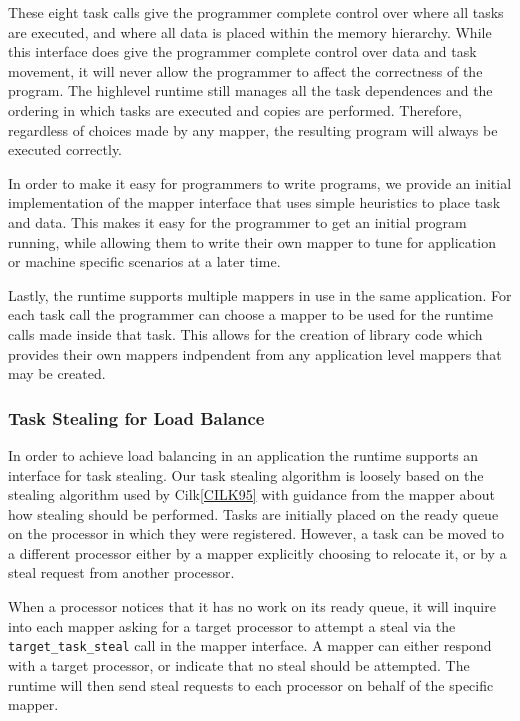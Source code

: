 These eight task calls give the programmer complete control over where all tasks are executed, and
where all data is placed within the memory hierarchy.  While this interface does give the programmer
complete control over data and task movement, it will never allow the programmer to affect the
correctness of the program.  The highlevel runtime still manages all the task dependences and the
ordering in which tasks are executed and copies are performed.  Therefore, regardless of choices
made by any mapper, the resulting program will always be executed correctly.

In order to make it easy for programmers to write programs, we provide an initial implementation 
of the mapper interface that uses simple heuristics to place task and data.  This makes it easy
for the programmer to get an initial program running, while allowing them to write their own
mapper to tune for application or machine specific scenarios at a later time.

Lastly, the runtime supports multiple mappers in use in the same application.  For each task 
call the programmer can choose a mapper to be used for the runtime calls made inside that
task.  This allows for the creation of library code which provides their own mappers indpendent
from any application level mappers that may be created.

\subsubsection{Task Stealing for Load Balance}
\label{subsec:steal}
In order to achieve load balancing in an application the runtime supports an interface
for task stealing.  Our task stealing algorithm is loosely based on the stealing algorithm
used by Cilk\ref{CILK95} with guidance from the mapper about how stealing should be
performed.  Tasks are initially placed on the ready queue on the processor in which they
were registered.  However, a task can be moved to a different processor either by a mapper
explicitly choosing to relocate it, or by a steal request from another processor.

When a processor notices that it has no work on its ready queue, it will inquire into each
mapper asking for a target processor to attempt a steal via the {\tt target\_task\_steal}
call in the mapper interface.  A mapper can either respond with
a target processor, or indicate that no steal should be attempted.  The runtime will then
send steal requests to each processor on behalf of the specific mapper.  

